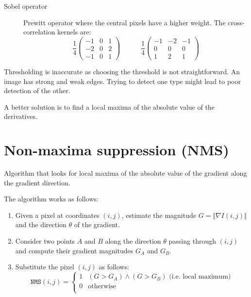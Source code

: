 \begin{description}
\begin{description}
            \item[Sobel operator] 
                Prewitt operator where the central pixels have a higher weight.
                The cross-correlation kernels are:
                \[ 
                    \frac{1}{4} \begin{pmatrix} -1 & 0 & 1 \\ -2 & 0 & 2 \\ -1 & 0 & 1 \end{pmatrix} 
                    \hspace{3em} 
                    \frac{1}{4} \begin{pmatrix} -1 & -2 & -1 \\ 0 & 0 & 0 \\ 1 & 2 & 1 \end{pmatrix} 
                \]
        \end{description}
\end{description}

\begin{remark}
    Thresholding is inaccurate as choosing the threshold is not straightforward.
    An image has strong and weak edges. Trying to detect one type might lead to poor detection of the other.

    A better solution is to find a local maxima of the absolute value of the derivatives.
\end{remark}



\section{Non-maxima suppression (NMS)}

Algorithm that looks for local maxima of the absolute value of the gradient along the gradient direction.

The algorithm works as follows:
\begin{enumerate}
    \item Given a pixel at coordinates $(i, j)$,
        estimate the magnitude $G = \Vert \nabla I(i, j) \Vert$ and the direction $\theta$ of the gradient.
    \item Consider two points $A$ and $B$ along the direction $\theta$ passing through $(i, j)$
        and compute their gradient magnitudes $G_A$ and $G_B$.
    \item Substitute the pixel $(i, j)$ as follows:
        \[ \texttt{NMS}(i, j) = \begin{cases}
            1 & (G > G_A) \land (G > G_B) \text{ (i.e. local maximum)} \\
            0 & \text{otherwise} \\
        \end{cases} \]
\end{enumerate}

